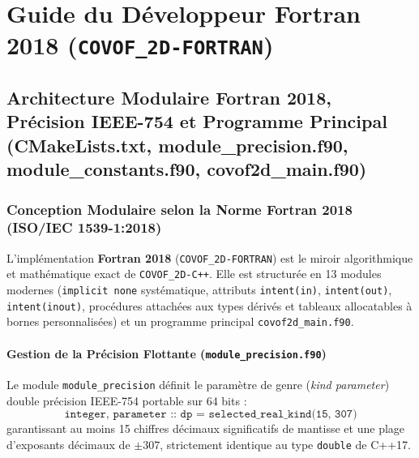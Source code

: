 \documentclass[10pt,a4paper,oneside]{book}
\begin{document}
\part{Guide du Développeur Fortran 2018 (\texttt{COVOF\_2D-FORTRAN})}
\chapter{Architecture Modulaire Fortran 2018, Précision IEEE-754 et Programme Principal (CMakeLists.txt, module_precision.f90, module_constants.f90, covof2d_main.f90)}
\section{Conception Modulaire selon la Norme Fortran 2018 (ISO/IEC 1539-1:2018)}
L'implémentation \textbf{Fortran 2018} (\texttt{COVOF\_2D-FORTRAN}) est le miroir algorithmique et mathématique exact de \texttt{COVOF\_2D-C++}. Elle est structurée en 13 modules modernes (\texttt{implicit none} systématique, attributs \texttt{intent(in)}, \texttt{intent(out)}, \texttt{intent(inout)}, procédures attachées aux types dérivés et tableaux allocatables à bornes personnalisées) et un programme principal \texttt{covof2d\_main.f90}.

\subsection{Gestion de la Précision Flottante (\texttt{module\_precision.f90})}
Le module \texttt{module\_precision} définit le paramètre de genre (\emph{kind parameter}) double précision IEEE-754 portable sur 64 bits :
\begin{equation}
  \texttt{integer, parameter :: dp = selected\_real\_kind(15, 307)}
\end{equation}
garantissant au moins 15 chiffres décimaux significatifs de mantisse et une plage d'exposants décimaux de $\pm 307$, strictement identique au type \texttt{double} de C++17.
\end{document}
